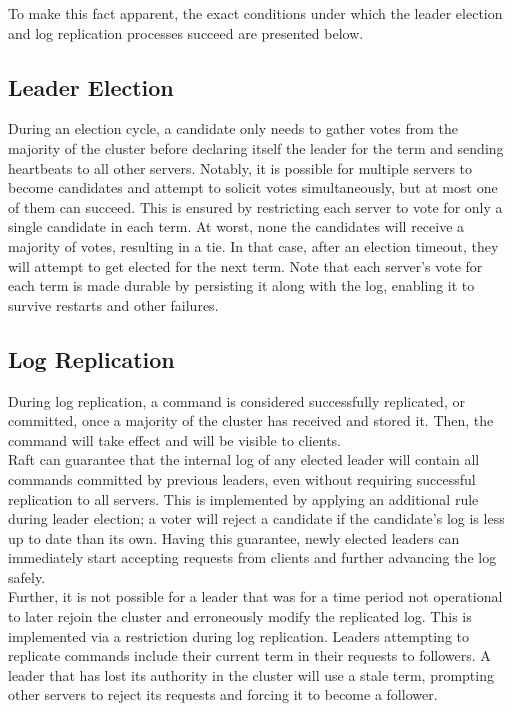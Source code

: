 To make this fact apparent, the exact conditions under which the leader election and log replication processes succeed are presented below.

\subsection{Leader Election} \label{leader-election-fault-tolerance}

During an election cycle, a candidate only needs to gather votes from the majority of the cluster before declaring itself the leader for the term and sending heartbeats to all other servers. Notably, it is possible for multiple servers to become candidates and attempt to solicit votes simultaneously, but at most one of them can succeed. This is ensured by restricting each server to vote for only a single candidate in each term. At worst, none the candidates will receive a majority of votes, resulting in a tie. In that case, after an election timeout, they will attempt to get elected for the next term. Note that each server's vote for each term is made durable by persisting it along with the log, enabling it to survive restarts and other failures.\\

\subsection{Log Replication}

During log replication, a command is considered successfully replicated, or committed, once a majority of the cluster has received and stored it. Then, the command will take effect and will be visible to clients.\\

Raft can guarantee that the internal log of any elected leader will contain all commands committed by previous leaders, even without requiring successful replication to all servers. This is implemented by applying an additional rule during leader election; a voter will reject a candidate if the candidate's log is less up to date than its own. Having this guarantee, newly elected leaders can immediately start accepting requests from clients and further advancing the log safely.\\

Further, it is not possible for a leader that was for a time period not operational to later rejoin the cluster and erroneously modify the replicated log. This is implemented via a restriction during log replication. Leaders attempting to replicate commands include their current term in their requests to followers. A leader that has lost its authority in the cluster will use a stale term, prompting other servers to reject its requests and forcing it to become a follower.\\

